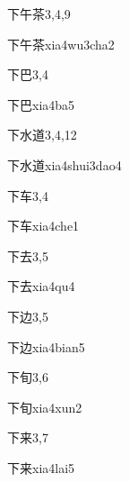 \begin{entry}{下午茶}{3,4,9}
  \begin{phonetics}{下午茶}{xia4wu3cha2}
  \end{phonetics}
\end{entry}

\begin{entry}{下巴}{3,4}
  \begin{phonetics}{下巴}{xia4ba5}
  \end{phonetics}
\end{entry}

\begin{entry}{下水道}{3,4,12}
  \begin{phonetics}{下水道}{xia4shui3dao4}
  \end{phonetics}
\end{entry}

\begin{entry}{下车}{3,4}
  \begin{phonetics}{下车}{xia4che1}
  \end{phonetics}
\end{entry}

\begin{entry}{下去}{3,5}
  \begin{phonetics}{下去}{xia4qu4}
  \end{phonetics}
\end{entry}

\begin{entry}{下边}{3,5}
  \begin{phonetics}{下边}{xia4bian5}
  \end{phonetics}
\end{entry}

\begin{entry}{下旬}{3,6}
  \begin{phonetics}{下旬}{xia4xun2}
  \end{phonetics}
\end{entry}

\begin{entry}{下来}{3,7}
  \begin{phonetics}{下来}{xia4lai5}
  \end{phonetics}
\end{entry}

